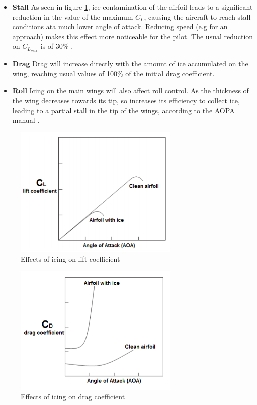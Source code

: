 \begin{itemize}
\item \textbf{Stall }As seen in figure \ref{fig:icing_lift}, ice contamination of the airfoil leads to a significant reduction in the value of the maximum $C_L$, causing the aircraft to reach stall conditions ata much lower angle of attack. Reducing speed (e.g for an approach) makes this effect more noticeable for the pilot. The usual reduction on $C_{L_{max}}$ is of 30\% \cite{icing_cond}.

\item \textbf{Drag }Drag will increase directly with the amount of ice accumulated on the wing, reaching usual values of 100\% of the initial drag coefficient.

\item \textbf{Roll }Icing on the main wings will also affect roll control. As the thickness of the wing decreases towards its tip, so increases its efficiency to collect ice, leading to a partial stall in the tip of the wings, according to the AOPA manual \cite{icing_aopa}.
\end{itemize}
\begin{figure}[H]
\centering
\includegraphics[width=0.7\textwidth]{Figures/Results/icing_lift.PNG}
\caption[Effects of icing on lift coefficient]{Effects of icing on lift coefficient \cite{icing_cond}}
\label{fig:icing_lift}
\end{figure}
\begin{figure}[H]
\centering
\includegraphics[width=0.7\textwidth]{Figures/Results/icing_drag.PNG}
\caption[Effects of icing on drag coefficient]{Effects of icing on drag coefficient \cite{icing_cond}}
\label{fig:icing_drag}
\end{figure}

